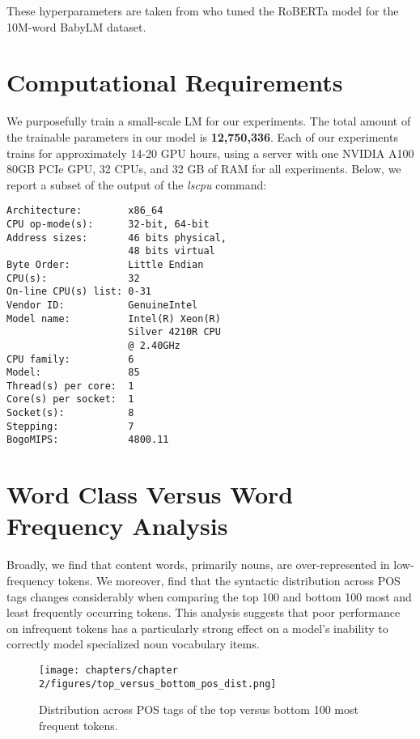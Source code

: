These hyperparameters are taken from \citet{diehlmartinez2023climb} who tuned the RoBERTa model for the 10M-word BabyLM dataset. 

\section{Computational Requirements}
\label{section:appendix-computational-requirements}

We purposefully train a small-scale LM for our experiments. The total amount of the trainable parameters in our model is \textbf{12,750,336}. Each of our experiments trains for approximately 14-20 GPU hours, using a server with one NVIDIA A100 80GB PCIe GPU, 32 CPUs, and 32 GB of RAM for all experiments. Below, we report a subset of the output of the \emph{lscpu} command:

\begin{tcolorbox}[left=5pt,right=5pt,top=5pt,bottom=5pt]
\small
\begin{verbatim}
Architecture:        x86_64
CPU op-mode(s):      32-bit, 64-bit
Address sizes:       46 bits physical, 
                     48 bits virtual
Byte Order:          Little Endian
CPU(s):              32
On-line CPU(s) list: 0-31
Vendor ID:           GenuineIntel
Model name:          Intel(R) Xeon(R)
                     Silver 4210R CPU
                     @ 2.40GHz
CPU family:          6
Model:               85
Thread(s) per core:  1
Core(s) per socket:  1
Socket(s):           8
Stepping:            7
BogoMIPS:            4800.11
\end{verbatim}
\end{tcolorbox}
\vfill
\section{Word Class Versus Word Frequency Analysis}
\label{section:word-class-versus-word-frequency}

Broadly, we find that content words, primarily nouns, are over-represented in low-frequency tokens. We moreover, find that the syntactic distribution across POS tags changes considerably when comparing the top 100 and bottom 100 most and least frequently occurring tokens. This analysis suggests that poor performance on infrequent tokens has a particularly strong effect on a model's inability to correctly model specialized noun vocabulary items. 

\begin{figure}[h!]
    \centering
    \texttt{[image: chapters/chapter 2/figures/top\_versus\_bottom\_pos\_dist.png]}
    \caption{Distribution across POS tags of the top versus bottom 100 most frequent tokens.}
    \label{fig:top-100-pos-dist}
\end{figure}

